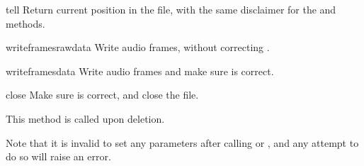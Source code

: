 \begin{methoddesc}{tell}{}
Return current position in the file, with the same disclaimer for
the  and  methods.
\end{methoddesc}

\begin{methoddesc}{writeframesraw}{data}
Write audio frames, without correcting .
\end{methoddesc}

\begin{methoddesc}{writeframes}{data}
Write audio frames and make sure  is correct.
\end{methoddesc}

\begin{methoddesc}{close}{}
Make sure  is correct, and close the file.

This method is called upon deletion.
\end{methoddesc}

Note that it is invalid to set any parameters after calling
 or , and any attempt
to do so will raise an error.
